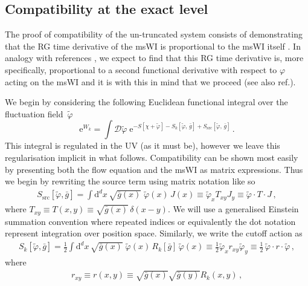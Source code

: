 \documentclass[11pt]{book} %
\numberwithin{equation}{chapter}
\begin{document}
\subsection{Compatibility at the exact level}\label{sec:exact}

The proof of compatibility of the un-truncated system consists of demonstrating that the
RG time derivative of the msWI is proportional to the msWI itself \cite{Litim:1998qi, Litim:1998wk}.
In analogy with references \cite{Litim:1998qi, Litim:1998wk},
we expect to find that this RG time derivative is, more specifically,
proportional to a second functional derivative with respect to $\varphi$ acting on
the msWI and it is with this in mind that we proceed (see also ref.\cite{Safari:2015dva}).

We begin by considering the following Euclidean functional integral over the fluctuation field~$\tilde\varphi$
\begin{equation}
  \mathrm e^{W_k} = \int \mathcal{D}\tilde\varphi \;
  \mathrm e^{-S[\chi+\tilde\varphi]-S_k[\tilde\varphi,\, \bar g]
  + S_{\mathrm{src}}[\tilde\varphi, \, \bar g]} \,.
  \label{Z}
\end{equation}
This integral is regulated in the UV (as it must be), however we leave this regularisation implicit
in what follows. Compatibility can be shown most easily by presenting both the flow equation and the
msWI as matrix expressions. Thus we begin by rewriting the source term using matrix notation like so
\begin{align}
	S_\mathrm{src}[\tilde\varphi,\bar g] = \int \mathrm d^d x \, \sqrt{\bar g(x)} \;
  \tilde\varphi(x) \, J(x)
  \equiv \tilde\varphi_xT_{xy}J_y
  \equiv \tilde\varphi\cdot T\cdot J \,,
\end{align}
where $T_{xy}\equiv T(x,y)\equiv\sqrt{\bar g(x)} \, \delta(x-y)$. We will use a generalised
Einstein summation convention where repeated indices or equivalently the dot notation represent
integration over position space. Similarly, we write the cutoff action as
\begin{align}
  S_k[\tilde\varphi, \bar g] = \frac{1}{2} \int \mathrm d^d x \, \sqrt{\bar g(x)} \;
  \tilde\varphi(x) \, R_k[\bar g] \, \tilde\varphi(x)
  \equiv \frac{1}{2}\tilde\varphi_x r_{xy} \tilde\varphi_{y}
  \equiv\frac{1}{2}\,\tilde\varphi\cdot r \cdot\tilde\varphi \,,
  \label{cutoff-action}
\end{align}
where
\begin{align}
  r_{xy}\equiv r(x,y)\equiv\sqrt{\bar g(x)}\sqrt{\bar g(y)}R_{k}(x,y)\,,
  \label{odd-r}
\end{align}
\end{document}
